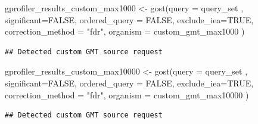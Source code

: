 \documentclass[
]{book}
\newenvironment{Shaded}{\begin{snugshade}}{\end{snugshade}}
\newcommand{\AttributeTok}[1]{\textcolor[rgb]{0.77,0.63,0.00}{#1}}
\newcommand{\CommentTok}[1]{\textcolor[rgb]{0.56,0.35,0.01}{\textit{#1}}}
\newcommand{\ConstantTok}[1]{\textcolor[rgb]{0.00,0.00,0.00}{#1}}
\newcommand{\DecValTok}[1]{\textcolor[rgb]{0.00,0.00,0.81}{#1}}
\newcommand{\FunctionTok}[1]{\textcolor[rgb]{0.00,0.00,0.00}{#1}}
\newcommand{\NormalTok}[1]{#1}
\newcommand{\OtherTok}[1]{\textcolor[rgb]{0.56,0.35,0.01}{#1}}
\newcommand{\SpecialCharTok}[1]{\textcolor[rgb]{0.00,0.00,0.00}{#1}}
\newcommand{\StringTok}[1]{\textcolor[rgb]{0.31,0.60,0.02}{#1}}
\begin{document}
\begin{Shaded}
\begin{Highlighting}[]
\NormalTok{gprofiler\_results\_custom\_max1000 }\OtherTok{\textless{}{-}} \FunctionTok{gost}\NormalTok{(}\AttributeTok{query =}\NormalTok{ query\_set ,}
                                     \AttributeTok{significant=}\ConstantTok{FALSE}\NormalTok{,}
                                      \AttributeTok{ordered\_query =} \ConstantTok{FALSE}\NormalTok{,}
                                      \AttributeTok{exclude\_iea=}\ConstantTok{TRUE}\NormalTok{,}
                                     \AttributeTok{correction\_method =} \StringTok{"fdr"}\NormalTok{,}
                                 \AttributeTok{organism =}\NormalTok{ custom\_gmt\_max1000}
\NormalTok{                                     )}
\end{Highlighting}
\end{Shaded}

\begin{verbatim}
## Detected custom GMT source request
\end{verbatim}

\begin{Shaded}
\begin{Highlighting}[]
\NormalTok{gprofiler\_results\_custom\_max10000 }\OtherTok{\textless{}{-}} \FunctionTok{gost}\NormalTok{(}\AttributeTok{query =}\NormalTok{ query\_set ,}
                                     \AttributeTok{significant=}\ConstantTok{FALSE}\NormalTok{,}
                                      \AttributeTok{ordered\_query =} \ConstantTok{FALSE}\NormalTok{,}
                                      \AttributeTok{exclude\_iea=}\ConstantTok{TRUE}\NormalTok{,}
                                     \AttributeTok{correction\_method =} \StringTok{"fdr"}\NormalTok{,}
                                 \AttributeTok{organism =}\NormalTok{ custom\_gmt\_max10000}
\NormalTok{                                     )}
\end{Highlighting}
\end{Shaded}

\begin{verbatim}
## Detected custom GMT source request
\end{verbatim}

\begin{Shaded}
\end{Shaded}
\end{document}
